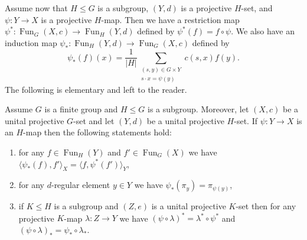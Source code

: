 \documentclass[eqthmnum,nocolour,skinny]{jt-calcs}
\DeclareMathOperator{\Fun}{Fun}
\begin{document}
\begin{pa}\label{pa:ind-map}
Assume now that $H \leqslant G$ is a subgroup, $(Y,d)$ is a projective $H$-set, and $\psi : Y \to X$ is a projective $H$-map. Then we have a restriction map $\psi^* : \Fun_G(X,c) \to \Fun_H(Y,d)$ defined by $\psi^*(f) = f\circ\psi$. We also have an induction map $\psi_* : \Fun_H(Y,d) \to \Fun_G(X,c)$ defined by
\begin{equation*}
\psi_*(f)(x) = \frac{1}{|H|}\sum_{\substack{(s,y) \in G\times Y\\ s \cdot x = \psi(y)}} c(s,x)f(y).
\end{equation*}
The following is elementary and left to the reader.
\end{pa}

\begin{prop}\label{prop:fun-G-sets-bumper}
Assume $G$ is a finite group and $H \leqslant G$ is a subgroup. Moreover, let $(X,c)$ be a unital projective $G$-set and let $(Y,d)$ be a unital projective $H$-set. If $\psi : Y \to X$ is an $H$-map then the following statements hold:
\begin{enumerate}[label=\textnormal{(\roman*)}]
	\item for any $f \in \Fun_H(Y)$ and $f' \in \Fun_G(X)$ we have $\langle \psi_*(f),f'\rangle_X = \langle f,\psi^*(f')\rangle_Y$,
	\item for any $d$-regular element $y \in Y$ we have $\psi_*(\pi_y) = \pi_{\psi(y)}$,
	\item if $K \leqslant H$ is a subgroup and $(Z,e)$ is a unital projective $K$-set then for any projective $K$-map $\lambda : Z \to Y$ we have $(\psi\circ\lambda)^* = \lambda^*\circ\psi^*$ and $(\psi\circ\lambda)_* = \psi_*\circ\lambda_*$.
\end{enumerate}
\end{prop}
\end{document}
